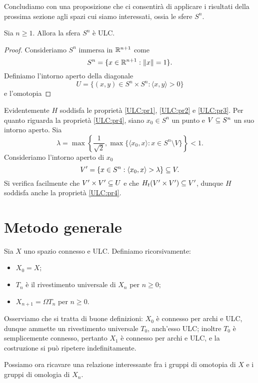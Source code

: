 Concludiamo con una proposizione che ci consentirà di applicare i risultati della prossima sezione agli spazi cui siamo interessati, ossia le sfere $S^n$.

\begin{proposition}
Sia $n\ge 1$. Allora la sfera $S^n$ è ULC.
\end{proposition}
\begin{proof}
Consideriamo $S^n$ immersa in $\mathbb{R}^{n+1}$ come
$$
S^n=\{x\in\mathbb{R}^{n+1}:\left\lVert x\right\rVert=1\}.
$$
Definiamo l'intorno aperto della diagonale
$$
U=\{(x,y)\in S^n\times S^n:\langle x,y\rangle>0\}
$$
e l'omotopia
\end{proof}
Evidentemente $H$ soddisfa le proprietà \ref{ULC:pr1}, \ref{ULC:pr2} e \ref{ULC:pr3}. Per quanto riguarda la proprietà \ref{ULC:pr4}, siano $x_0\in S^n$ un punto e $V\subseteq S^n$ un suo intorno aperto. Sia
$$
\lambda=\max\left\{\frac{1}{\sqrt{2}},\max\{\langle x_0,x\rangle:x\in S^n\setminus V\}\right\}<1.
$$
Consideriamo l'intorno aperto di $x_0$
$$
V'=\{x\in S^n:\langle x_0,x\rangle>\lambda\}\subseteq V.
$$
Si verifica facilmente che $V'\times V'\subseteq U$ e che $H_t(V'\times V')\subseteq V'$, dunque $H$ soddisfa anche la proprietà \ref{ULC:pr4}.

\section{Metodo generale}

Sia $X$ uno spazio connesso e ULC. Definiamo ricorsivamente:
\begin{itemize}
\item $X_0=X$;
\item $T_n$ è il rivestimento universale di $X_n$ per $n\ge 0$;
\item $X_{n+1}=\Omega T_n$ per $n\ge 0$.
\end{itemize}
Osserviamo che si tratta di buone definizioni: $X_0$ è connesso per archi e ULC, dunque ammette un rivestimento universale $T_0$, anch'esso ULC; inoltre $T_0$ è semplicemente connesso, pertanto $X_1$ è connesso per archi e ULC, e la costruzione si può ripetere indefinitamente.

Possiamo ora ricavare una relazione interessante fra i gruppi di omotopia di $X$ e i gruppi di omologia di $X_n$.

